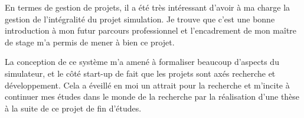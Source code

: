		En termes de gestion de projets, il a été très intéressant d'avoir à ma charge la gestion de l'intégralité du projet simulation. Je trouve que c'est une bonne introduction à mon futur parcours professionnel et l'encadrement de mon maître de stage m'a permis de mener à bien ce projet.

		La conception de ce système m'a amené à formaliser beaucoup d'aspects du simulateur, et le côté start-up de \forssea{} fait que les projets sont axés recherche et développement. Cela a éveillé en moi un attrait pour la recherche et m'incite à continuer mes études dans le monde de la recherche par la réalisation d'une thèse à la suite de ce projet de fin d'études.